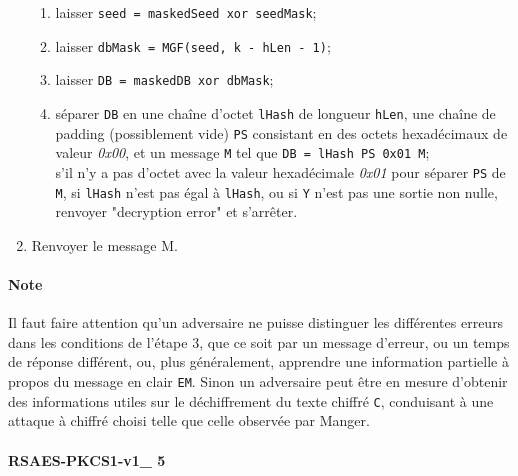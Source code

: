 \begin{enumerate}
\begin{enumerate}
       \item laisser \texttt{seed = maskedSeed xor seedMask};
       \item laisser \texttt{dbMask = MGF(seed, k - hLen - 1)};
       \item laisser \texttt{DB = maskedDB xor dbMask};
       \item séparer \texttt{DB} en une chaîne d'octet \texttt{lHash} de longueur \texttt{hLen}, une chaîne de padding (possiblement vide) \texttt{PS} consistant en des octets hexadécimaux de valeur \textit{0x00}, et un message \texttt{M} tel que \texttt{DB = lHash \textbar\textbar PS \textbar\textbar 0x01 \textbar\textbar M};
\\ s'il n'y a pas d'octet avec la valeur hexadécimale \textit{0x01} pour séparer \texttt{PS} de \texttt{M}, si \texttt{lHash} n'est pas égal à \texttt{lHash}, ou si \texttt{Y} n'est pas une sortie non nulle, renvoyer "decryption error" et s'arrêter.\\
\end{enumerate}
\item Renvoyer le message M.\\
\end{enumerate}
\paragraph{Note} Il faut faire attention qu'un adversaire ne puisse distinguer les différentes erreurs dans les conditions de l'étape 3, que ce soit par un message d'erreur, ou un temps de réponse différent, ou, plus généralement, apprendre une information partielle à propos du message en clair \texttt{EM}. Sinon un adversaire peut être en mesure d'obtenir des informations utiles sur le déchiffrement du texte chiffré \texttt{C}, conduisant à une attaque à chiffré choisi telle que celle observée par Manger.
   
\paragraph{RSAES-PKCS1-v1\_ 5}

